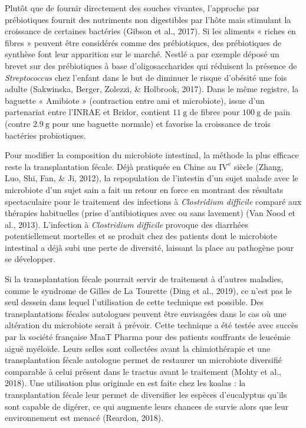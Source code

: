 \documentclass[12pt,a4paper]{reedthesis}
\theoremstyle{definition}
\theoremstyle{definition}
\theoremstyle{definition}
\theoremstyle{remark}
\begin{document}
Plutôt que de fournir directement des souches vivantes, l'approche par prébiotiques fournit des nutriments non digestibles par l'hôte mais stimulant la croissance de certaines bactéries (Gibson et al., 2017). Si les aliments « riches en fibres » peuvent être considérés comme des prébiotiques, des prébiotiques de synthèse font leur apparition sur le marché. Nestlé a par exemple déposé un brevet sur des prébiotiques à base d'oligosaccharides qui réduisent la présence de \emph{Streptococcus} chez l'enfant dans le but de diminuer le risque d'obésité une fois adulte (Sakwinska, Berger, Zolezzi, \& Holbrook, 2017). Dans le même registre, la baguette « Amibiote » (contraction entre ami et microbiote), issue d'un partenariat entre l'INRAE et Bridor, contient \(11~\text{g}\) de fibres pour \(100~\text{g}\) de pain (contre \(2.9~\text{g}\) pour une baguette normale) et favorise la croissance de trois bactéries probiotiques.

Pour modifier la composition du microbiote intestinal, la méthode la plus efficace reste la transplantation fécale. Déjà pratiquée en Chine au \(\text{IV}^{\text{e}}\) siècle (Zhang, Luo, Shi, Fan, \& Ji, 2012), la repopulation de l'intestin d'un sujet malade avec le microbiote d'un sujet sain a fait un retour en force en montrant des résultats spectaculaire pour le traitement des infections à \emph{Clostridium difficile} comparé aux thérapies habituelles (prise d'antibiotiques avec ou sans lavement) (Van Nood et al., 2013). L'infection à \emph{Clostridium difficile} provoque des diarrhées potentiellement mortelles et se produit chez des patients dont le microbiote intestinal a déjà subi une perte de diversité, laissant la place au pathogène pour se développer.

Si la transplantation fécale pourrait servir de traitement à d'autres maladies, comme le syndrome de Gilles de La Tourette (Ding et al., 2019), ce n'est pas le seul dessein dans lequel l'utilisation de cette technique est possible. Des transplantations fécales autologues peuvent être envisagées dans le cas où une altération du microbiote serait à prévoir. Cette technique a été testée avec succès par la société française MaaT Pharma pour des patients souffrants de leucémie aiguë myéloïde. Leurs selles sont collectées avant la chimiothérapie et une transplantation fécale autologue permet de restaurer un microbiote diversifié comparable à celui présent dans le tractus avant le traitement (Mohty et al., 2018). Une utilisation plus originale en est faite chez les koalas : la transplantation fécale leur permet de diversifier les espèces d'eucalyptus qu'ils sont capable de digérer, ce qui augmente leurs chances de survie alors que leur environnement est menacé (Reardon, 2018).
\end{document}
